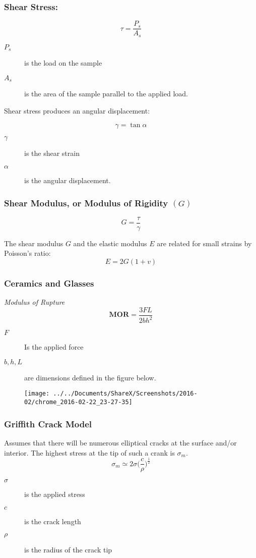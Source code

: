 \documentclass[10pt,letterpaper]{article}
\begin{document}
	\subsubsection*{Shear Stress:}
	$$
	\tau = \frac{P_s}{A_s}
	$$
	\begin{description}
		\item[$P_s$] is the load on the sample
		\item[$A_s$] is the area of the sample parallel to the applied load. 
	\end{description}
	
	Shear stress produces an angular displacement:
	
	$$
	\gamma = \tan \alpha
	$$
	\begin{description}
		\item[$\gamma$] is the shear strain
		\item[$\alpha$] is the angular displacement.
	\end{description}
	
	
	
	\subsubsection*{Shear Modulus, or Modulus of Rigidity $(G)$}
	$$
	G = \frac{\tau}{\gamma}
	$$
	
	The shear modulus $G$ and the elastic modulus $E$ are related for small strains by Poisson's ratio:
	$$
	E = 2G(1 + v)
	$$ 
	
	\subsubsection*{Ceramics and Glasses}
	\emph{Modulus of Rupture}
	$$
	\textbf{MOR} = \frac{3FL}{2bh^2}
	$$
	\begin{description}
		\item[$F$] Is the applied force
		\item[$b,h,L$] are dimensions defined in the figure below. 
	\end{description}
	\begin{figure}
\centering
\texttt{[image: ../../Documents/ShareX/Screenshots/2016-02/chrome\_2016-02-22\_23-27-35]}
\end{figure}

\subsubsection*{Griffith Crack Model}
Assumes that there will be numerous elliptical cracks at the surface and/or interior. The highest stress at the tip of such a crank is $\sigma_m$.
$$
\sigma_m \simeq 2\sigma\bigg( \frac{c}{\rho} \bigg)^{{\frac{1}{2}}}
$$
\begin{description}
	\item[$\sigma$] is the applied stress
	\item[$c$] is the crack length
	\item[$\rho$] is the radius of the crack tip
\end{description}
\end{document}
